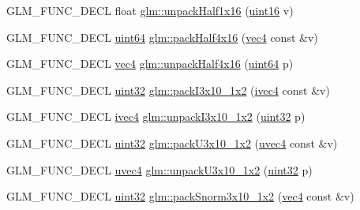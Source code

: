 \begin{DoxyCompactItemize}
\item 
G\+L\+M\+\_\+\+F\+U\+N\+C\+\_\+\+D\+E\+CL float \hyperlink{group__gtc__packing_gaa6eebcdfc746584b7d1823f1d5344fed}{glm\+::unpack\+Half1x16} (\hyperlink{group__gtc__type__precision_gad8c2939e1fdd8e5828b31d95c52255d5}{uint16} v)
\item 
G\+L\+M\+\_\+\+F\+U\+N\+C\+\_\+\+D\+E\+CL \hyperlink{group__gtc__type__precision_gae3632bf9b37da66233d78930dd06378a}{uint64} \hyperlink{group__gtc__packing_ga8104f0b719b7792491f2b789a6dd6f96}{glm\+::pack\+Half4x16} (\hyperlink{group__core__types_ga5881b1b022d7fd1b7218f5916532dd02}{vec4} const \&v)
\item 
G\+L\+M\+\_\+\+F\+U\+N\+C\+\_\+\+D\+E\+CL \hyperlink{group__core__types_ga5881b1b022d7fd1b7218f5916532dd02}{vec4} \hyperlink{group__gtc__packing_gaea526d6491ad40401eac34803984bf27}{glm\+::unpack\+Half4x16} (\hyperlink{group__gtc__type__precision_gae3632bf9b37da66233d78930dd06378a}{uint64} p)
\item 
G\+L\+M\+\_\+\+F\+U\+N\+C\+\_\+\+D\+E\+CL \hyperlink{group__gtc__type__precision_ga202b6a53c105fcb7e531f9b443518451}{uint32} \hyperlink{group__gtc__packing_ga032e18fa5bc5b8f3897104aeb2f1e195}{glm\+::pack\+I3x10\+\_\+1x2} (\hyperlink{group__core__types_gaa4560ddc50320ea8f8a70d5c9c249fea}{ivec4} const \&v)
\item 
G\+L\+M\+\_\+\+F\+U\+N\+C\+\_\+\+D\+E\+CL \hyperlink{group__core__types_gaa4560ddc50320ea8f8a70d5c9c249fea}{ivec4} \hyperlink{group__gtc__packing_ga08bcd34cf9c34701d658dd861ee6e300}{glm\+::unpack\+I3x10\+\_\+1x2} (\hyperlink{group__gtc__type__precision_ga202b6a53c105fcb7e531f9b443518451}{uint32} p)
\item 
G\+L\+M\+\_\+\+F\+U\+N\+C\+\_\+\+D\+E\+CL \hyperlink{group__gtc__type__precision_ga202b6a53c105fcb7e531f9b443518451}{uint32} \hyperlink{group__gtc__packing_gaf656d8862628f96b20de7a36eaa1fe56}{glm\+::pack\+U3x10\+\_\+1x2} (\hyperlink{group__core__types_ga1c426d19627b32b14f0089f7f4ba7b1d}{uvec4} const \&v)
\item 
G\+L\+M\+\_\+\+F\+U\+N\+C\+\_\+\+D\+E\+CL \hyperlink{group__core__types_ga1c426d19627b32b14f0089f7f4ba7b1d}{uvec4} \hyperlink{group__gtc__packing_ga119aa2d7d55952f9dc4214390a6ffefc}{glm\+::unpack\+U3x10\+\_\+1x2} (\hyperlink{group__gtc__type__precision_ga202b6a53c105fcb7e531f9b443518451}{uint32} p)
\item 
G\+L\+M\+\_\+\+F\+U\+N\+C\+\_\+\+D\+E\+CL \hyperlink{group__gtc__type__precision_ga202b6a53c105fcb7e531f9b443518451}{uint32} \hyperlink{group__gtc__packing_ga0d4157cec37c0312216a7be1cc92df54}{glm\+::pack\+Snorm3x10\+\_\+1x2} (\hyperlink{group__core__types_ga5881b1b022d7fd1b7218f5916532dd02}{vec4} const \&v)

\end{DoxyCompactItemize}
